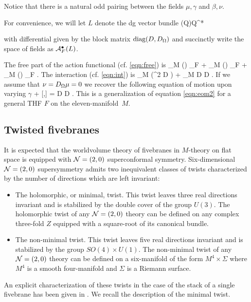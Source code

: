 Notice that there is a natural odd pairing between the fields $\mu, \gamma$ and $\beta, \nu$.

For convenience, we will let $L$ denote the dg vector bundle
\beqn
\Pi (\C \oplus Q)\to Q^* \oplus \C
\eeqn

with differential given by the block matrix $\operatorname{diag}(D, D_\Omega)$ and succinctly write the space of fields as $\mathcal A^{\bullet}_{F}(L)$.

The free part of the action functional (cf. \eqref{eqn:free}) is 
\beqn
\int_M (\gamma \thfd \mu) \Omega_F + \int_M (\beta \thfd \gamma) \Omega_F + \int_M (\beta \Div \mu) \Omega_F .
\eeqn
The interaction (cf. \eqref{eqn:int}) is
\beqn
\label{eqn:int}
 \int_{M} (\mu^2 D \gamma)  +  \int_{M} \gamma D \gamma D \gamma .
\eeqn
If we assume that $\nu = D_\Omega \mu = 0$ we recover the following equation of motion upon varying $\gamma$
\beqn
\thfd \mu +  [\mu,\mu] = D \gamma D \gamma .
\eeqn
This is a generalization of equation \eqref{eqn:eom2} for a general THF $F$ on the eleven-manifold~$M$.

\subsection{Twisted fivebranes}

It is expected that the worldvolume theory of fivebranes in $M$-theory on flat space is equipped with $\mathcal N=(2,0)$ superconformal symmetry.
Six-dimensional $\mathcal N=(2,0)$ supersymmetry admits two inequivalent classes of twists characterized by the number of directions which are left invariant:
\begin{itemize}
\item
The holomorphic, or minimal, twist.
This twist leaves three real directions invariant and is stabilized by the double cover of the group $U(3)$.
The holomorphic twist of any $\mathcal N=(2,0)$ theory can be defined on any complex three-fold $Z$ equipped with a square-root of its canonical bundle.
\item
The non-minimal twist.
This twist leaves five real directions invariant and is stabilized by the group $SO(4) \times U(1)$.
The non-minimal twist of any $\mathcal N=(2,0)$ theory can be defined on a six-manifold of the form $M^4 \times \Sigma$ where $M^4$ is a smooth four-manifold and $\Sigma$ is a Riemann surface.
\end{itemize}

An explicit characterization of these twists in the case of the stack of a single fivebrane has been given in \cite{SWtensor}.
We recall the description of the minimal twist.

